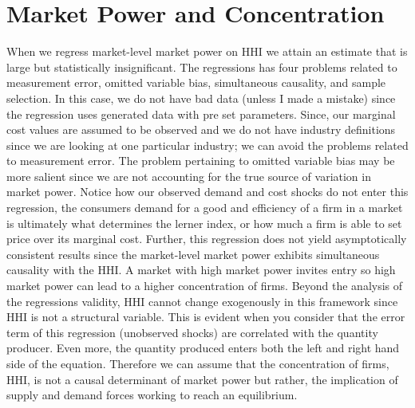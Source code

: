 \documentclass[12pt]{article}
\begin{document}
\section{Market Power and Concentration}
When we regress market-level market power on HHI we attain an estimate that is large but statistically insignificant. The regressions has four problems related to measurement error, omitted variable bias, simultaneous causality, and sample selection. In this case, we do not have bad data (unless I made a mistake) since the regression uses generated data with pre set parameters. Since, our marginal cost values are assumed to be observed and we do not have industry definitions since we are looking at one particular industry; we can avoid the problems related to measurement error. The problem pertaining to omitted variable bias may be more salient since we are not accounting for the true source of variation in market power. Notice how our observed demand and cost shocks do not enter this regression, the consumers demand for a good and efficiency of a firm in a market is ultimately what determines the lerner index, or how much a firm is able to set price over its marginal cost. Further, this regression does not yield asymptotically consistent results since the market-level market power exhibits simultaneous causality with the HHI. A market with high market power invites entry so high market power can lead to a higher concentration of firms. Beyond the analysis of the regressions validity, HHI cannot change exogenously in this framework since HHI is not a structural variable. This is evident when you consider that the error term of this regression (unobserved shocks) are correlated with the quantity producer. Even more, the quantity produced enters both the left and right hand side of the equation. Therefore we can assume that the concentration of firms, HHI, is not a causal determinant of market power but rather, the implication of supply and demand forces working to reach an equilibrium. 
\end{document}
